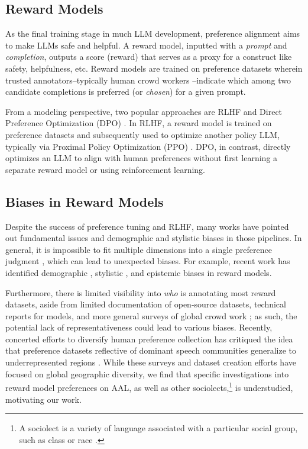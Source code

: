 \subsection{Reward Models}
As the final training stage in much LLM development, preference alignment aims to make LLMs safe and helpful. A reward model, inputted with a \textit{prompt} and \textit{completion}, outputs a score (reward) that serves as a proxy for a construct like safety, helpfulness, etc. Reward models are trained on preference datasets wherein trusted annotators--typically human crowd workers \citep{bai_training_2022, wang_helpsteer_2023}--indicate which among two candidate completions is preferred (or \textit{chosen}) for a given prompt.

From a modeling perspective, two popular approaches are RLHF \citep{christiano_deep_2017, ouyang_training_2022} and Direct Preference Optimization (DPO) \cite{rafailov_direct_2024}. In RLHF, a reward model is trained on preference datasets and subsequently used to optimize another policy LLM, typically via Proximal Policy Optimization (PPO) \cite{schulman_proximal_2017}. DPO, in contrast, directly optimizes an LLM to align with human preferences without first learning a separate reward model or using reinforcement learning. 

\subsection{Biases in Reward Models}
Despite the success of preference tuning and RLHF, many works have pointed out fundamental issues and demographic and stylistic biases in those pipelines. In general, it is impossible to fit multiple dimensions into a single preference judgment \cite{casper2023open}, which can lead to unexpected biases. For example, recent work has identified demographic \cite{ryan-etal-2024-unintended}, stylistic \citep{singhal_long_2023}, and epistemic biases \citep{zhou2024relying} in reward models. 

Furthermore, there is limited visibility into \textit{who} is annotating most reward datasets, aside from limited documentation of open-source datasets, technical reports for models, and more general surveys of global crowd work \cite{casper_open_2023, posch_characterizing_2022}; as such, the potential lack of representativeness could lead to various biases. Recently, concerted efforts to diversify human preference collection has critiqued the idea that preference datasets reflective of dominant speech communities generalize to underrepresented regions \cite{kirk_prism_2024}. While these surveys and dataset creation efforts have focused on global geographic diversity, we find that specific investigations into reward model preferences on AAL, as well as other sociolects,\footnote{A sociolect is a variety of language associated with a particular social group, such as class or race \cite{wolfram2004varieties}.} is understudied, motivating our work.

